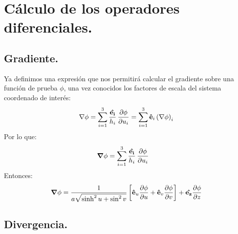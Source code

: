 \documentclass[12pt]{article}
\numberwithin{equation}{section}
\begin{document}

\section{Cálculo de los operadores diferenciales.}

\subsection{Gradiente.}

Ya definimos una expresión que nos permitirá calcular el gradiente sobre una función de prueba $\phi$, una vez conocidos los factores de escala del sistema coordenado de interés:
\begin{align*}
\nabla{\phi} = \sum_{i=1}^{3} \dfrac{\vu{e_{i}}}{h_{i}} \, \pdv{\phi}{u_{i}} = \sum_{i=1}^{3} \vu{e}_{i} \left( \nabla{\phi} \right)_{i}
\end{align*}
Por lo que: 
\begin{align*}
\grad{\phi} &= \sum_{i=1}^{3} \dfrac{\vu{e_{i}}}{h_{i}} \, \pdv{\phi}{u_{i}}
\end{align*}
Entonces:
\begin{align*}
\grad{\phi} = \dfrac{1}{a \sqrt{\sinh^{2} u + \sin^{2} v}} \left[ \vu{e}_{u} \pdv{\phi}{u} + \vu{e}_{v} \pdv{\phi}{v} \right] + \vu{e_{z}} \pdv{\phi}{z}
\end{align*}

\subsection{Divergencia.}
\end{document}
